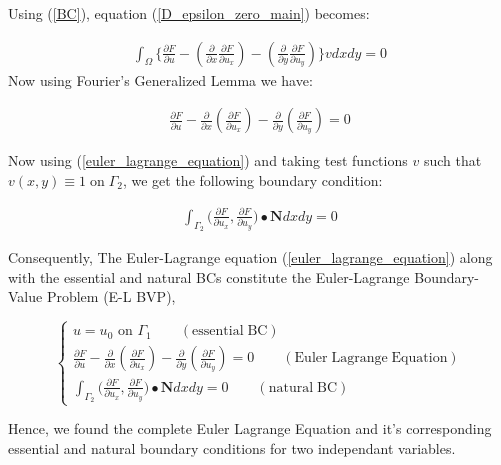 \noindent
Using (\ref{BC}), equation (\ref{D_epsilon_zero_main}) becomes:

\begin{align}
    \int_{\Omega} \Bigg\{  \frac{\partial F}{\partial u}    - \left(\frac{\partial }{\partial x} \frac{\partial F}{\partial u_x} \right)   - \left(\frac{\partial }{\partial y} \frac{\partial F}{\partial u_y} \right)    \Bigg\}v dxdy = 0
\end{align}
\noindent
Now using Fourier's Generalized Lemma we have:


\begin{align}\label{euler_lagrange_equation}
    \frac{\partial F}{\partial u}    - \frac{\partial }{\partial x} \left(\frac{\partial F}{\partial u_x} \right)   - \frac{\partial }{\partial y} \left(\frac{\partial F}{\partial u_y} \right) = 0
\end{align}

\noindent
Now using (\ref{euler_lagrange_equation}) and taking test functions $v$ such that $v(x,y)\equiv 1 \mathrm{\;on\;} \Gamma_2$, we get the following boundary condition:

\begin{align}
\int_{\Gamma_2} \Bigg( \frac{\partial F}{\partial u_x} ,  \frac{\partial F}{\partial u_y} \Bigg) \bullet \mathbf{N} dxdy=0
\end{align}

\noindent Consequently, The Euler-Lagrange equation (\ref{euler_lagrange_equation}) along with the essential and natural BCs constitute the Euler-Lagrange Boundary-Value Problem (E-L BVP),

\[ \begin{cases} 
      u = u_0 \text{ on } \Gamma_1  \qquad \mathrm{(essential\;BC)}\\
      \frac{\partial F}{\partial u}    - \frac{\partial }{\partial x} \left(\frac{\partial F}{\partial u_x} \right)   - \frac{\partial }{\partial y} \left(\frac{\partial F}{\partial u_y} \right) = 0  \qquad \mathrm{(Euler\;Lagrange\;Equation)}\\
      \int_{\Gamma_2} \Bigg( \frac{\partial F}{\partial u_x} ,  \frac{\partial F}{\partial u_y} \Bigg) \bullet \mathbf{N} dxdy=0 \qquad \mathrm{(natural\;BC)}
    \end{cases}  
\]


Hence, we found the complete Euler Lagrange Equation and it's corresponding essential and natural boundary conditions for two independant variables.
\newpage